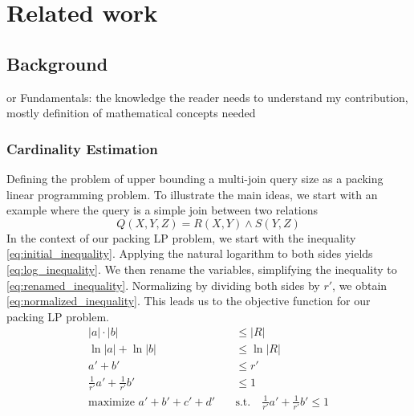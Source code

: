 
\chapter{Related work}\label{chapter:relatedwork}

\section{Background}
or Fundamentals: the knowledge the reader needs to understand my contribution, mostly definition of mathematical concepts needed

\subsection{Cardinality Estimation}
Defining the problem of upper bounding a multi-join query size as a packing linear programming problem.
To illustrate the main ideas, we start with an example where the query is a simple join
between two relations
\[
Q(X, Y, Z) = R(X, Y) \land S(Y, Z)
\]
In the context of our packing LP problem, we start with the inequality \ref{eq:initial_inequality}. Applying the natural logarithm to both sides yields \ref{eq:log_inequality}. We then rename the variables, simplifying the inequality to \ref{eq:renamed_inequality}. 
Normalizing by dividing both sides by \(r'\), we obtain \ref{eq:normalized_inequality}. This leads us to the objective function for our packing LP problem.
\begin{align}
    |a| \cdot |b| &\leq |R| \label{eq:initial_inequality} \\
    \ln|a| + \ln|b| &\leq \ln|R| \label{eq:log_inequality} \\
    a' + b' &\leq r' \label{eq:renamed_inequality} \\
    \frac{1}{r'} a' + \frac{1}{r'} b' &\leq 1 \label{eq:normalized_inequality} \\
    \text{maximize } a' + b' + c' + d' \quad &\text{s.t.} \quad \frac{1}{r'} a' + \frac{1}{r'} b' \leq 1 \label{eq:objective_function}
    \end{align}




